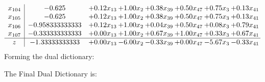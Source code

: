 \documentclass[8pt]{article}
\begin{document}
\[\begin{array}{c| c c@{\hskip 2pt} c@{\hskip 2pt} c@{\hskip 2pt} c@{\hskip 2pt} c@{\hskip 2pt} c@{\hskip 2pt} }
 x_{104}   &  -0.625 & +  0.12 x_{13} & +  1.00 x_{2} & +  0.38 x_{39} & +  0.50 x_{47} & +  0.75 x_{3} & +  0.13 x_{41}\\
 x_{105}   &  -0.625 & +  0.12 x_{13} & +  1.00 x_{2} & +  0.38 x_{39} & +  0.50 x_{47} & +  0.75 x_{3} & +  0.13 x_{41}\\
 x_{106}   &  -0.958333333333 & +  0.12 x_{13} & +  1.00 x_{2} & +  0.04 x_{39} & +  0.50 x_{47} & +  0.08 x_{3} & +  0.79 x_{41}\\
 x_{107}   &  -0.333333333333 & +  0.00 x_{13} & +  1.00 x_{2} & +  0.67 x_{39} & +  1.00 x_{47} & +  0.33 x_{3} & +  0.67 x_{41}\\
\hline
z    &  -1.33333333333 & +  0.00 x_{13} & -6.00 x_{2} & -0.33 x_{39} & +  0.00 x_{47} & -5.67 x_{3} & -0.33 x_{41}\\
\end{array}\]
Forming the dual dictionary:

The Final Dual Dictionary is: 
\end{document}
